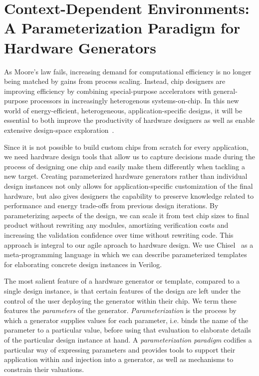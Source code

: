 \chapter{Context-Dependent Environments: \\ A Parameterization Paradigm for Hardware Generators}
\label{c.parameters}

As Moore's law fails, increasing demand for computational efficiency is no longer being matched by gains from process scaling. 
Instead, chip designers are improving efficiency by combining special-purpose accelerators with general-purpose processors in increasingly heterogenous systems-on-chip.
In this new world of energy-efficient, heterogeneous, application-specific designs, it will be essential to both improve the productivity of hardware designers as well as enable extensive design-space exploration~\cite{shacham-micro10}.

Since it is not possible to build custom chips from scratch for every application,
we need hardware design tools that allow us to capture decisions made
during the process of designing one chip and easily make them differently when tackling a new target.
Creating parameterized hardware generators rather than individual design instances not only allows for application-specific customization of the final hardware,
but also gives designers the capability to preserve knowledge related to performance and energy trade-offs from previous design iterations.
By parameterizing aspects of the design, we can scale it from test chip sizes to final product without rewriting any modules, amortizing verification costs and increasing the validation confidence over time without rewriting code.
This approach is integral to our agile aproach to hardware design.
We use Chisel~\cite{chisel} as a meta-programming language in which we can describe parameterized
templates for elaborating concrete design instances in Verilog.

The most salient feature of a hardware generator or template,
compared to a single design instance, is that certain features of the design are
left under the control of the user deploying the generator within their chip.
We term these features the {\em parameters} of the generator.
{\em Parameterization} is the process by which a generator supplies values for each parameter,
i.e. binds the name of the parameter to a particular value,
before using that evaluation to elaborate details of the particular design instance at hand.
A {\em parameterization paradigm} codifies a particular way of expressing parameters and provides tools to support their application within and injection into a generator,
as well as mechanisms to constrain their valuations.


